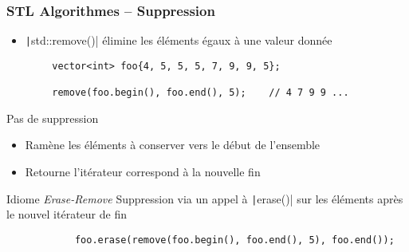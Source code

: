\documentclass[C++.tex]{subfiles}
\begin{document}
\begin{frame}[fragile]
	\frametitle{STL Algorithmes -- Suppression}
	\begin{itemize}
		\item \texttt|std::remove()| élimine les éléments égaux à une valeur donnée
	\end{itemize}

	\begin{verbatim}
		vector<int> foo{4, 5, 5, 5, 7, 9, 9, 5};

		remove(foo.begin(), foo.end(), 5);    // 4 7 9 9 ...
	\end{verbatim}

	\begin{alertblock}{Pas de suppression}
		\begin{itemize}
			\item Ramène les éléments à conserver vers le début de l'ensemble
			\item Retourne l'itérateur correspond à la nouvelle fin
		\end{itemize}
	\end{alertblock}


	\begin{block}{Idiome \textit{Erase-Remove}}
		Suppression via un appel à \texttt|erase()| sur les éléments après le nouvel itérateur de fin

		\begin{verbatim}
			foo.erase(remove(foo.begin(), foo.end(), 5), foo.end());
		\end{verbatim}
	\end{block}
\end{frame}
\end{document}
